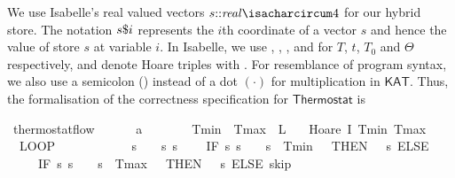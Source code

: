 \documentclass[envcountsame,envcountsect]{llncs}
\newcommand{\KAT}{\mathsf{KAT}}
\begin{document}
\begin{example}
We use Isabelle's real valued vectors $s{\isacharcolon}{\isacharcolon}\mathit{real}{\isacharcircum}4$ for our hybrid store. The notation $s{\emph{$\$$}}i$ represents the $i$th coordinate of a vector $s$ and
hence the value of store $s$ at variable $i$. In Isabelle, we use , , , and  for $T$, $t$, $T_0$ and $\Theta$ respectively, and denote Hoare triples with . For resemblance of program syntax, we also use a semicolon (\isa{{\isacharsemicolon}}) instead of a dot $(\cdot)$ for multiplication in $\KAT$. Thus, the formalisation of the correctness specification for $\mathsf{Thermostat}$ is

\begin{isabellebody}
\isanewline
{}\isamarkupfalse%
\ thermostat{\isacharunderscore}flow{\isacharcolon}\ \isanewline
\ \ \ {\isachardoublequoteopen}{}\ {\isacharless}\ a{\isachardoublequoteclose}\ \ {\isachardoublequoteopen}{}\ {\isasymle}\ {\isasymtau}{\isachardoublequoteclose}\ \ {\isachardoublequoteopen}{}\ {\isacharless}\ Tmin{\isachardoublequoteclose}\ \ {\isachardoublequoteopen}Tmax\ {\isacharless}\ L{\isachardoublequoteclose}\isanewline
\ \ \ {\isachardoublequoteopen}Hoare\ {\isasymlceil}I\ Tmin\ Tmax{\isasymrceil}\isanewline
\ \ {\isacharparenleft}LOOP\ {\isacharparenleft}\isanewline
\ \ \ \ %
\isanewline
\ \ \ \ {\isacharparenleft}{}\ {\isacharcolon}{\isacharcolon}{\isacharequal}\ {\isacharparenleft}{\isasymlambda}s{\isachardot}\ {}{\isacharparenright}{\isacharparenright}{\isacharsemicolon}\ {\isacharparenleft}{}\ {\isacharcolon}{\isacharcolon}{\isacharequal}\ {\isacharparenleft}{\isasymlambda}s{\isachardot}\ s{\isachardollar}{}{\isacharparenright}{\isacharparenright}{\isacharsemicolon}\isanewline
\ \ \ \ {\isacharparenleft}IF\ {\isacharparenleft}{\isasymlambda}s{\isachardot}\ s{\isachardollar}{}\ {\isacharequal}\ {}\ {\isasymand}\ s{\isachardollar}{}\ {\isasymle}\ Tmin\ {\isacharplus}\ {}{\isacharparenright}\ THEN\ {\isacharparenleft}{}\ {\isacharcolon}{\isacharcolon}{\isacharequal}\ {\isacharparenleft}{\isasymlambda}s{\isachardot}{}{\isacharparenright}{\isacharparenright}\ ELSE\isanewline
\ \ \ \ \ IF\ {\isacharparenleft}{\isasymlambda}s{\isachardot}\ s{\isachardollar}{}\ {\isacharequal}\ {}\ {\isasymand}\ s{\isachardollar}{}\ {\isasymge}\ Tmax\ {\isacharminus}\ {}{\isacharparenright}\ THEN\ {\isacharparenleft}{}\ {\isacharcolon}{\isacharcolon}{\isacharequal}\ {\isacharparenleft}{\isasymlambda}s{\isachardot}{}{\isacharparenright}{\isacharparenright}\ ELSE\ skip{\isacharparenright}{\isacharsemicolon}\isanewline

\end{isabellebody}
\end{example}
\end{document}
